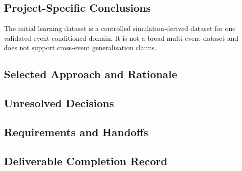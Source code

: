 
\subsection{Project-Specific Conclusions}
\label{sec:res-ml-dat-conclusions}

The initial learning dataset is a controlled simulation-derived dataset for one
validated event-conditioned domain. It is not a broad multi-event dataset and
does not support cross-event generalisation claims.

\subsection{Selected Approach and Rationale}
\label{sec:res-ml-dat-selected-approach}


\subsection{Unresolved Decisions}
\label{sec:res-ml-dat-unresolved-decisions}


\subsection{Requirements and Handoffs}
\label{sec:res-ml-dat-requirements}


\subsection{Deliverable Completion Record}
\label{sec:res-ml-dat-completion-record}

%
%
%
